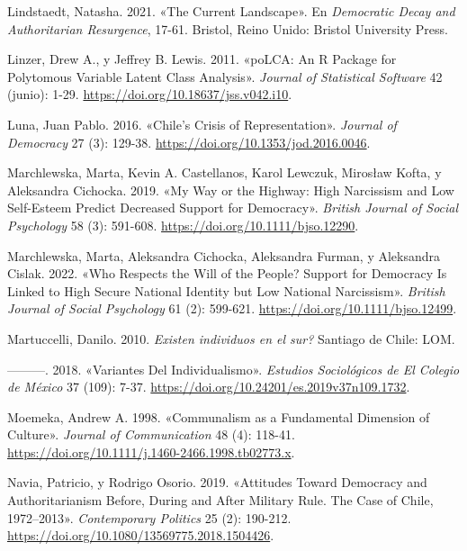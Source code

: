 \documentclass[
  letterpaper,
  DIV=11,
  numbers=noendperiod]{scrartcl}
\newlength{\cslhangindent}
\newenvironment{CSLReferences}[2] %
 {\begin{list}{}{%
  \setlength{\itemindent}{0pt}
  \setlength{\leftmargin}{0pt}
  \setlength{\parsep}{0pt}
  \ifodd #1
   \setlength{\leftmargin}{\cslhangindent}
   \setlength{\itemindent}{-1\cslhangindent}
  \fi
  \setlength{\itemsep}{#2\baselineskip}}}
 {\end{list}}
\begin{document}
\begin{CSLReferences}{1}{0}
Lindstaedt, Natasha. 2021. {«The {Current Landscape}»}. En
\emph{Democratic {Decay} and {Authoritarian Resurgence}}, 17-61.
Bristol, Reino Unido: Bristol University Press.

Linzer, Drew A., y Jeffrey B. Lewis. 2011. {«{poLCA}: {An R Package} for
{Polytomous Variable Latent Class Analysis}»}. \emph{Journal of
Statistical Software} 42 (junio): 1-29.
\url{https://doi.org/10.18637/jss.v042.i10}.

Luna, Juan Pablo. 2016. {«Chile's {Crisis} of {Representation}»}.
\emph{Journal of Democracy} 27 (3): 129-38.
\url{https://doi.org/10.1353/jod.2016.0046}.

Marchlewska, Marta, Kevin A. Castellanos, Karol Lewczuk, Mirosław Kofta,
y Aleksandra Cichocka. 2019. {«My Way or the Highway: {High} Narcissism
and Low Self-Esteem Predict Decreased Support for Democracy»}.
\emph{British Journal of Social Psychology} 58 (3): 591-608.
\url{https://doi.org/10.1111/bjso.12290}.

Marchlewska, Marta, Aleksandra Cichocka, Aleksandra Furman, y Aleksandra
Cislak. 2022. {«Who Respects the Will of the People? {Support} for
Democracy Is Linked to High Secure National Identity but Low National
Narcissism»}. \emph{British Journal of Social Psychology} 61 (2):
599-621. \url{https://doi.org/10.1111/bjso.12499}.

Martuccelli, Danilo. 2010. \emph{{{\textquestiondown}Existen individuos
en el sur?}} Santiago de Chile: LOM.

---------. 2018. {«Variantes Del Individualismo»}. \emph{Estudios
Sociol{ó}gicos de El Colegio de M{é}xico} 37 (109): 7-37.
\url{https://doi.org/10.24201/es.2019v37n109.1732}.

Moemeka, Andrew A. 1998. {«Communalism as a {Fundamental Dimension} of
{Culture}»}. \emph{Journal of Communication} 48 (4): 118-41.
\url{https://doi.org/10.1111/j.1460-2466.1998.tb02773.x}.

Navia, Patricio, y Rodrigo Osorio. 2019. {«Attitudes Toward Democracy
and Authoritarianism Before, During and After Military Rule. {The} Case
of {Chile}, 1972--2013»}. \emph{Contemporary Politics} 25 (2): 190-212.
\url{https://doi.org/10.1080/13569775.2018.1504426}.


\end{CSLReferences}
\end{document}
